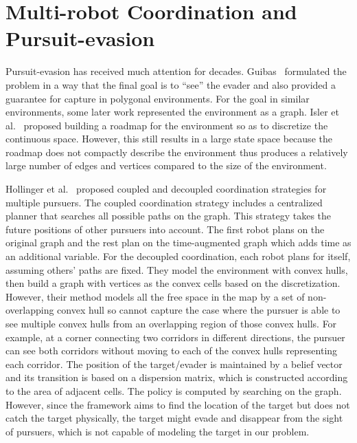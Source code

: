 \documentclass[../main.tex]{subfiles}
\begin{document}
\section{Multi-robot Coordination and Pursuit-evasion}
Pursuit-evasion has received much attention 
for decades. Guibas~\cite{guibas1999visibility} formulated the problem in a way that the final goal is to ``see'' the evader and also provided a guarantee for capture in polygonal environments. 
For the goal in similar environments, some later work represented the environment as a graph. Isler et al.~\cite{isler2005roadmap} proposed building a roadmap for the environment so as to discretize the continuous space. However, this still results in a large state space because the roadmap does not compactly describe the environment thus produces a relatively large number of edges and vertices compared to the size of the environment.

Hollinger et al.~\cite{hollinger2007probabilistic,hollinger2009efficient}
proposed coupled and decoupled coordination strategies for multiple pursuers. The coupled coordination strategy includes a centralized planner that searches all possible paths on the graph. This strategy takes the future positions of other pursuers into account. The first robot plans on the original graph and the rest plan on the time-augmented graph which adds time as an additional variable.
For the decoupled coordination, each robot plans for itself, assuming others' paths  are fixed. They model the environment with convex hulls, then build a graph with vertices as the convex cells based on the discretization. However, their method models all the free space in the map by a set of non-overlapping convex hull so cannot capture the case where the pursuer is able to see multiple convex hulls from an overlapping region of those convex hulls. For example, at a corner connecting two corridors in different directions, the pursuer can see both corridors without moving to each of the convex hulls representing each corridor.
The position of the target/evader is maintained by a belief vector and its transition is based on a dispersion matrix, which is constructed according to the area of adjacent cells. The policy is computed by searching on the graph. However, since the framework aims to find the location of the target but does not catch the target physically, the target might evade and disappear from the sight of pursuers, which is not capable of modeling the target in our problem.
\end{document}
